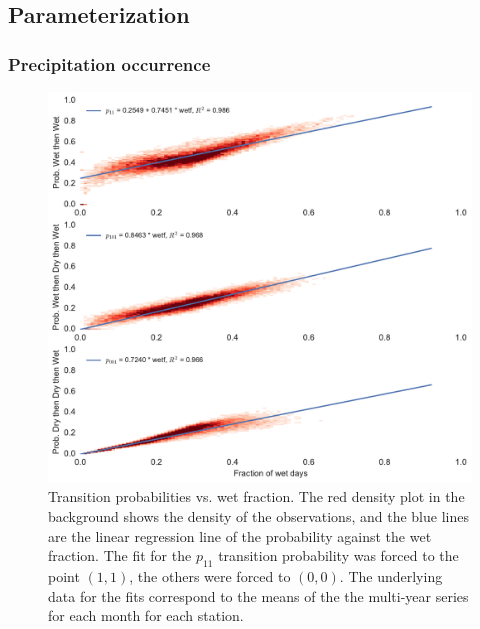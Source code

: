 \begin{refsection}
\subsection{Parameterization} \label{sec:param}

\subsubsection{Precipitation occurrence} \label{sec:markov}

\begin{figure}
	\includegraphics[width=\linewidth]{gwgen-figures/f03.pdf}
	\caption[Transition probabilities vs. wet fraction]{Transition probabilities vs. wet fraction. The red density plot in the background shows the density of the observations, and the blue lines are the linear regression line of the probability against the wet fraction. The fit for the $p_{11}$ transition probability was forced to the point $(1, 1)$, the others were forced to $(0, 0)$. The underlying data for the fits correspond to the means of the the multi-year series for each month for each station.}
	\label{fig:markov}
\end{figure}


\end{refsection}
